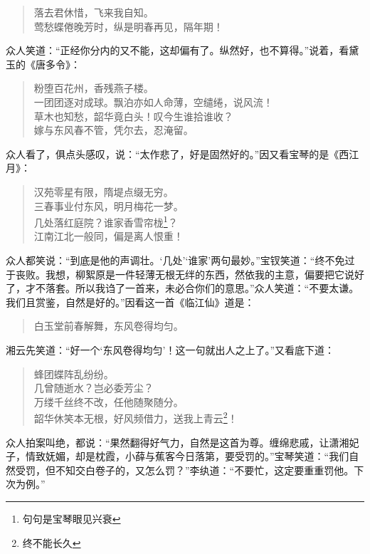 \documentclass[12pt,oneside]{book}
\newenvironment{shici}{%
\begin{verse}%
\centering\large\hspace{12pt}}%
{\end{verse}}
\begin{document}
\begin{shici}
落去君休惜，飞来我自知。\\
莺愁蝶倦晚芳时，纵是明春再见，隔年期！
\end{shici}

众人笑道：“正经你分内的又不能，这却偏有了。纵然好，也不算得。”说着，看黛玉的《唐多令》：

\begin{shici}
粉堕百花州，香残燕子楼。\\
一团团逐对成球。飘泊亦如人命薄，空缱绻，说风流！\\
草木也知愁，韶华竟白头！叹今生谁拾谁收？\\
嫁与东风春不管，凭尔去，忍淹留。
\end{shici}

众人看了，俱点头感叹，说：“太作悲了，好是固然好的。”因又看宝琴的是《西江月》：

\begin{shici}
汉苑零星有限，隋堤点缀无穷。\\
三春事业付东风，明月梅花一梦。\\
几处落红庭院？谁家香雪帘栊\footnote{句句是宝琴眼见兴衰}？\\
江南江北一般同，偏是离人恨重！
\end{shici}


众人都笑说：“到底是他的声调壮。‘几处’‘谁家’两句最妙。”宝钗笑道：“终不免过于丧败。我想，柳絮原是一件轻薄无根无绊的东西，然依我的主意，偏要把它说好了，才不落套。所以我诌了一首来，未必合你们的意思。”众人笑道：“不要太谦。我们且赏鉴，自然是好的。”因看这一首《临江仙》道是：

\begin{shici}
白玉堂前春解舞，东风卷得均匀。
\end{shici}

湘云先笑道：“好一个‘东风卷得均匀’！这一句就出人之上了。”又看底下道：

\begin{shici}
蜂团蝶阵乱纷纷。\\
几曾随逝水？岂必委芳尘？\\
万缕千丝终不改，任他随聚随分。\\
韶华休笑本无根，好风频借力，送我上青云\footnote{终不能长久}！
\end{shici}

众人拍案叫绝，都说：“果然翻得好气力，自然是这首为尊。缠绵悲戚，让潇湘妃子，情致妩媚，却是枕霞，小薛与蕉客今日落第，要受罚的。”宝琴笑道：“我们自然受罚，但不知交白卷子的，又怎么罚？”李纨道：“不要忙，这定要重重罚他。下次为例。”
\end{document}
